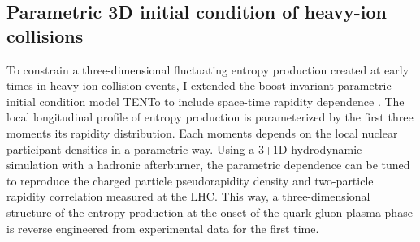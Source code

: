 \documentclass[12pt,a4paper]{article}
\begin{document}
\subsection{Parametric 3D initial condition of heavy-ion collisions}
To constrain a three-dimensional fluctuating entropy production created at early times in heavy-ion collision events, I extended the boost-invariant parametric initial condition model TENTo to include space-time rapidity dependence \cite{Ke:2016jrd}. 
The local longitudinal profile of entropy production is parameterized by the first three moments its rapidity distribution. 
Each moments depends on the local nuclear participant densities in a parametric way. 
Using a 3+1D hydrodynamic simulation with a hadronic afterburner, the parametric dependence can be tuned to reproduce the charged particle pseudorapidity density and two-particle rapidity correlation measured at the LHC. 
This way, a three-dimensional structure of the entropy production at the onset of the quark-gluon plasma phase is reverse engineered from experimental data for the first time.   



\end{document}
